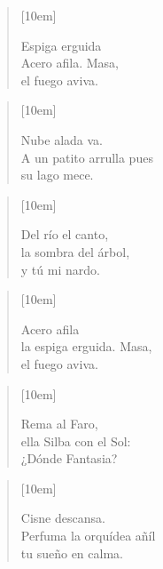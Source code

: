 \documentclass{article}
\begin{document}
\begin{verse}[10em]
	\begin{altverse}
		Espiga erguida\\ \hspace{1pt}
    Acero afila. Masa,\\
		el fuego aviva.\\
	\end{altverse}
\end{verse}

\begin{verse}[10em]
	\begin{altverse}
		Nube alada va.\\
		A un patito arrulla pues\\
		su lago mece.\\
	\end{altverse}
\end{verse}

\begin{verse}[10em]
	\begin{altverse}
		Del río el canto,\\
		la sombra del árbol,\\
		y tú mi nardo.\\
	\end{altverse}
\end{verse}

\begin{verse}[10em]
	\begin{altverse}

		Acero afila\\
		la espiga erguida. Masa,\\
		el fuego aviva.\\
	\end{altverse}
\end{verse}

\begin{verse}[10em]
	\begin{altverse}
		Rema al Faro,\\
		ella Silba con el Sol:\\
		¿Dónde Fantasia?\\
	\end{altverse}
\end{verse}

\begin{verse}[10em]
	\begin{altverse}
		Cisne descansa.\\
		Perfuma la orquídea añíl\\
		tu sueño en calma.\\
	\end{altverse}
\end{verse}
\end{document}
